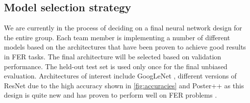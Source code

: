 \subsection{Model selection strategy}

We are currently in the process of deciding on a final neural network design for the entire group.
Each team member is implementing a number of different models based on the architectures that have
been proven to achieve good results in FER tasks. The final architecture will be selected based on validation performance. The held-out test set is used only once for the final unbiased evaluation. Architectures of interest include GoogLeNet \cite{DBLP:journals/corr/SzegedyLJSRAEVR14},
different versions of ResNet due to the high accuracy shown in \ref{fig:accuracies} and Poster++ as this design is 
quite new and has proven to perform well on FER problems \cite{mao2023postersimplerstrongerfacial}.
